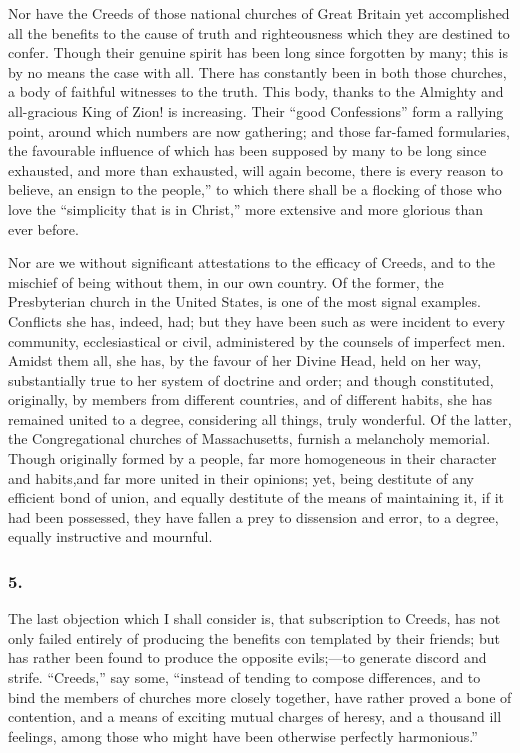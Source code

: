 \documentclass[
]{book}
\begin{document}
Nor have the Creeds of those national churches of Great Britain yet accomplished all the benefits to the cause of truth and righteousness which they are destined to confer. Though their genuine spirit has been long since forgotten by many; this is by no means the case with all. There has constantly been in both those churches, a body of faithful witnesses to the truth. This body, thanks to the Almighty and all-gracious King of Zion! is increasing. Their ``good Confessions'' form a rallying point, around which numbers are now gathering; and those far-famed formularies, the favourable influence of which has been supposed by many to be long since exhausted, and more than exhausted, will again become, there is every reason to believe, an ensign to the people,'' to which there shall be a flocking of those who love the ``simplicity that is in Christ,'' more extensive and more glorious than ever before.

Nor are we without significant attestations to the efficacy of Creeds, and to the mischief of being without them, in our own country. Of the former, the Presbyterian church in the United States, is one of the most signal examples. Conflicts she has, indeed, had; but they have been such as were incident to every community, ecclesiastical or civil, administered by the counsels of imperfect men. Amidst them all, she has, by the favour of her Divine Head, held on her way, substantially true to her system of doctrine and order; and though constituted, originally, by members from different countries, and of different habits, she has remained united to a degree, considering all things, truly wonderful. Of the latter, the Congregational churches of Massachusetts, furnish a melancholy memorial. Though originally formed by a people, far more homogeneous in their character and habits,and far more united in their opinions; yet, being destitute of any efficient bond of union, and equally destitute of the means of maintaining it, if it had been possessed, they have fallen a prey to dissension and error, to a degree, equally instructive and mournful.

\hypertarget{section-11}{%
\subsubsection*{5.}\label{section-11}}

The last objection which I shall consider is, that subscription to Creeds, has not only failed entirely of producing the benefits con templated by their friends; but has rather been found to produce the opposite evils;---to generate discord and strife. ``Creeds,'' say some, ``instead of tending to compose differences, and to bind the members of churches more closely together, have rather proved a bone of contention, and a means of exciting mutual charges of heresy, and a thousand ill feelings, among those who might have been otherwise perfectly harmonious.''
\end{document}
